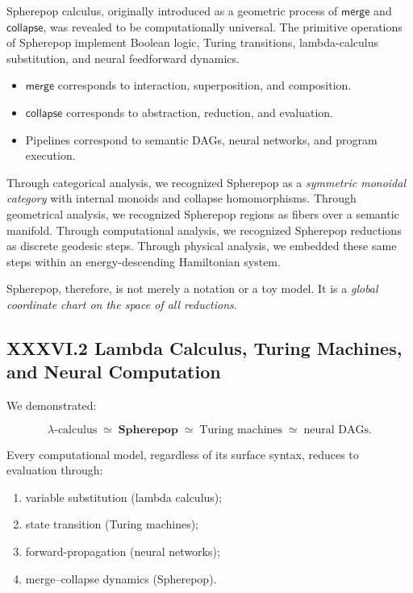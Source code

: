 \documentclass[12pt,letterpaper]{article}
\begin{document}
Spherepop calculus, originally introduced as a geometric process of 
$\mathsf{merge}$ and $\mathsf{collapse}$, was revealed to be 
computationally universal. The primitive operations of Spherepop
implement Boolean logic, Turing transitions, lambda-calculus substitution, 
and neural feedforward dynamics.

\begin{itemize}
  \item $\mathsf{merge}$ corresponds to interaction, superposition, and composition.
  \item $\mathsf{collapse}$ corresponds to abstraction, reduction, and evaluation.
  \item Pipelines correspond to semantic DAGs, neural networks, and program execution.
\end{itemize}

Through categorical analysis, we recognized Spherepop as a 
\emph{symmetric monoidal category} with internal monoids and collapse homomorphisms.  
Through geometrical analysis, we recognized Spherepop regions as fibers over a semantic manifold.  
Through computational analysis, we recognized Spherepop reductions as discrete geodesic steps.  
Through physical analysis, we embedded these same steps within an energy-descending Hamiltonian system.

Spherepop, therefore, is not merely a notation or a toy model.  
It is a \emph{global coordinate chart on the space of all reductions}.

\subsection{XXXVI.2 Lambda Calculus, Turing Machines, and Neural Computation}

We demonstrated:

\[
\lambda\text{-calculus}
\;\simeq\;
\mathbf{Spherepop}
\;\simeq\;
\text{Turing machines}
\;\simeq\;
\text{neural DAGs}.
\]

Every computational model, regardless of its surface syntax,
reduces to evaluation through:

\begin{enumerate}
    \item variable substitution (lambda calculus);
    \item state transition (Turing machines);
    \item forward-propagation (neural networks);
    \item merge--collapse dynamics (Spherepop).
\end{enumerate}
\end{document}
